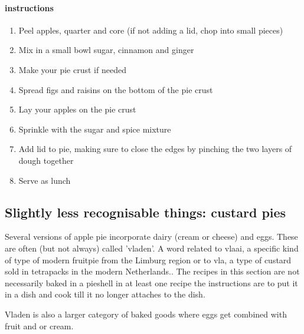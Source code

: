 \documentclass[a4paper]{article}
\begin{document}
\paragraph{instructions}
\begin{enumerate}
\item Peel apples, quarter and core (if not adding a lid, chop into small pieces)
\item Mix in a small bowl sugar, cinnamon and ginger
\item Make your pie crust if needed
\item Spread figs and raisins on the bottom of the pie crust
\item Lay your apples on the pie crust
\item Sprinkle with the sugar and spice mixture
\item Add lid to pie, making sure to close the edges by pinching the two layers of dough together
\item Serve as lunch
\end{enumerate}






\subsection{Slightly less recognisable things: custard pies}
Several versions of apple pie incorporate dairy (cream or cheese) and eggs. These are often (but not always) called 'vladen'. A word related to vlaai, a specific kind of type of modern fruitpie from the Limburg region or to vla, a type of custard sold in tetrapacks in the modern Netherlands.\cite{PhilippaEtymologisch}. The recipes in this section are not necessarily baked in a pieshell in at least one recipe the instructions are to put it in a dish and cook till it no longer attaches to the dish.

Vladen is also a larger category of baked goods where eggs get combined with fruit and or cream. 
\end{document}
